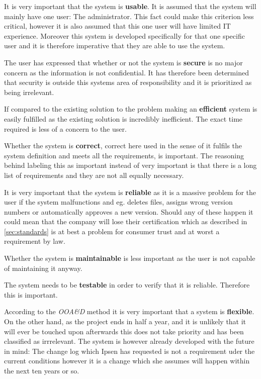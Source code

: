 It is very important that the system is \textbf{usable}. It is assumed that the system will mainly have one user: The administrator. This fact could make this criterion less critical, however it is also assumed that this one user will have limited IT experience. Moreover this system is developed specifically for that one specific user and it is therefore imperative that they are able to use the system.

The user has expressed that whether or not the system is \textbf{secure} is no major concern as the information is not confidential. It has therefore been determined that security is outside this systems area of responsibility and it is prioritized as being irrelevant.

If compared to the existing solution to the problem making an \textbf{efficient} system is easily fulfilled as the existing solution is incredibly inefficient. The exact time required is less of a concern to the user.

Whether the system is \textbf{correct}, correct here used in the sense of it fulfils the system definition and meets all the requirements, is important. The reasoning behind labeling this as important instead of very important is that there is a long list of requirements and they are not all equally necessary.

It is very important that the system is \textbf{reliable} as it is a massive problem for the user if the system malfunctions and eg. deletes files, assigns wrong version numbers or automatically approves a new version. Should any of these happen it could mean that the company will lose their certification which as described in \cref{sec:standards} is at best a problem for consumer trust and at worst a requirement by law.

Whether the system is \textbf{maintainable} is less important as the user is not capable of maintaining it anyway.
 
The system needs to be \textbf{testable} in order to verify that it is reliable. Therefore this is important.

According to the \textit{OOA&D} method it is very important that a system is \textbf{flexible}. On the other hand, as the project ends in half a year, and it is unlikely that it will ever be touched upon afterwards this does not take priority and has been classified as irrrelevant. The system is however already developed with the future in mind: The change log which Ipsen has requested is not a requirement uder the current conditions however it is a change which she assumes will happen within the next ten years or so.

